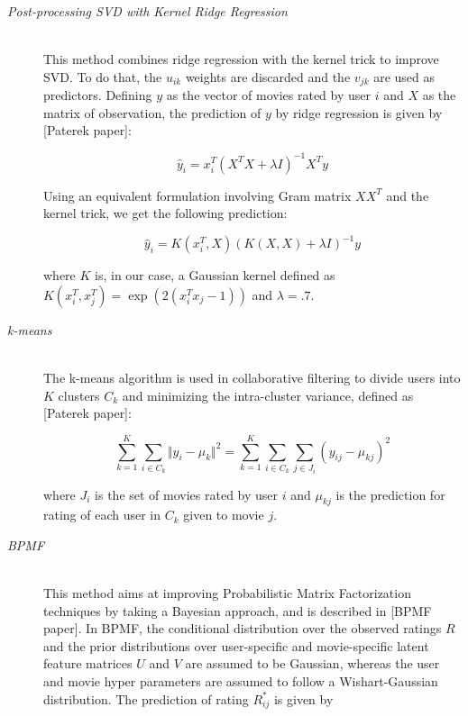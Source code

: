 \documentclass[10pt,conference,compsocconf]{IEEEtran}
\begin{document}
\begin{description}
\item[\emph{Post-processing SVD with Kernel Ridge Regression}] \ \\
This method combines ridge regression with the kernel trick to improve SVD. To do that, the $u_{ik}$ weights are discarded and the $v_{jk}$ are used as predictors. Defining $y$ as the vector of movies rated by user $i$ and $X$ as the matrix of observation, the prediction of $y$ by ridge regression is given by [Paterek paper]:

$$
\hat{y}_i = x_i^T(X^TX + \lambda I)^{-1}X^Ty
$$

\noindent Using an equivalent formulation involving Gram matrix $XX^T$ and the kernel trick, we get the following prediction:

$$
\hat{y}_i = K(x_i^T,X)(K(X,X) + \lambda I)^{-1}y
$$

\noindent where $K$ is, in our case, a Gaussian kernel defined as $K(x_i^T, x_j^T) = \exp(2(x_i^Tx_j-1))$ and $\lambda = .7$.
 
 
\item[\emph{k-means}]\ \\
The k-means algorithm is used in collaborative filtering to divide users into $K$ clusters $C_k$ and minimizing the intra-cluster variance, defined as [Paterek paper]:

$$
\sum_{k=1}^K \sum_{i \in C_k} \Vert y_i - \mu_k \Vert^2 = \sum_{k=1}^K \sum_{i \in C_k} \sum_{j \in J_i} (y_{ij} - \mu_{kj})^2
$$

\noindent where $J_i$ is the set of movies rated by user $i$ and $\mu_{kj}$ is the prediction for rating of each user in $C_k$ given to movie $j$.




\item[\emph{BPMF}] \ \\
This method aims at improving Probabilistic Matrix Factorization techniques by taking a Bayesian approach, and is described in [BPMF paper]. In BPMF, the conditional distribution over the observed ratings $R$ and the prior distributions over user-specific and movie-specific latent feature matrices $U$ and $V$ are assumed to be Gaussian, whereas the user and movie hyper parameters are assumed to follow a Wishart-Gaussian distribution. The prediction of rating $R_{ij}^*$ is given by


\end{description}
\end{document}
